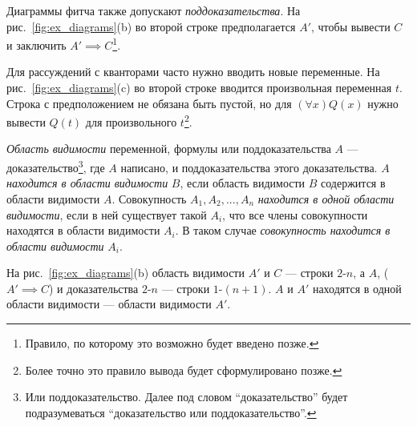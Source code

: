Диаграммы фитча также допускают {\it поддоказательства}.
На рис.~\ref{fig:ex_diagrams}(b)
во второй строке предполагается $A'$, чтобы вывести $C$ и заключить
${A'\implies C}$\footnote{Правило, по которому это возможно будет введено позже.}.

Для рассуждений с кванторами часто нужно вводить новые переменные.
На рис.~\ref{fig:ex_diagrams}(c) во второй строке вводится произвольная переменная $t$.
Строка с предположением не
обязана быть пустой, но для $(\forall x)Q(x)$ нужно вывести $Q(t)$
для произвольного $t$\footnote{
	Более точно это правило вывода будет сформулировано позже.}.

{\it Область видимости} переменной, формулы или поддоказательства $A$ ---
доказательство\footnote{
	Или поддоказательство. Далее под словом ``доказательство'' будет подразумеваться
	``доказательство или поддоказательство''.}, где $A$ написано,
и поддоказательства этого доказательства. $A$ {\it находится
		в области видимости} $B$, если область видимости $B$
содержится в области видимости $A$.
Совокупность $A_1,A_2,...,A_{n}$ {\it находится в одной области видимости},
если в ней существует такой $A_{i}$, что все члены совокупности находятся в
области видимости $A_{i}$. В таком случае {\it совокупность находится в области
видимости} $A_{i}$.

На рис.~\ref{fig:ex_diagrams}(b) область видимости $A'$ и $C$ --- строки $2$-$n$,
а $A$, (${A'\implies C}$) и доказательства $2$-$n$ --- строки $1$-$(n+1)$.
$A$ и $A'$ находятся в одной области видимости --- области видимости $A'$.
